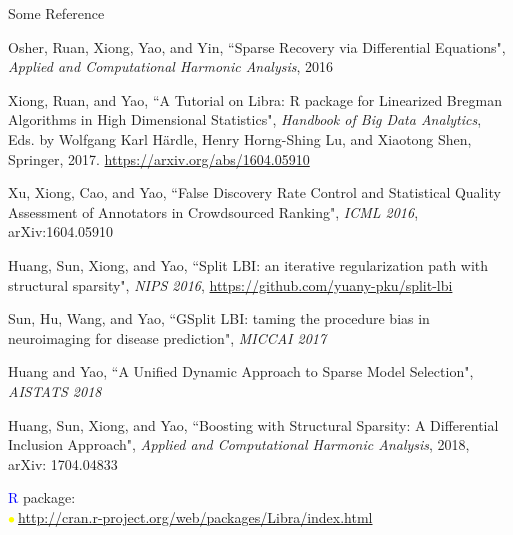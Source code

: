 \documentclass[slidestop,compress,9pt,epsfig,color]{beamer}
\theoremstyle{example}
\providecommand{\subitem}{\\ \textcolor{yellow}{$\bullet\ $}}
\begin{document}
\begin{frame}{Some Reference}
\begin{itemize}{\tiny
\item Osher, Ruan, Xiong, Yao, and Yin, ``Sparse Recovery via Differential Equations", \emph{Applied and Computational Harmonic Analysis}, 2016
\item Xiong, Ruan, and Yao, ``A Tutorial on Libra: R package for Linearized Bregman Algorithms in High Dimensional Statistics", \emph{Handbook of Big Data Analytics}, Eds. by Wolfgang Karl H\"{a}rdle, Henry Horng-Shing Lu, and Xiaotong Shen, Springer, 2017. \url{https://arxiv.org/abs/1604.05910}
\item Xu, Xiong, Cao, and Yao, ``False Discovery Rate Control and Statistical Quality Assessment of Annotators in Crowdsourced Ranking", \emph{ICML 2016}, arXiv:1604.05910
\item Huang, Sun, Xiong, and Yao, ``Split LBI: an iterative regularization path with structural sparsity", \emph{NIPS 2016}, \url{https://github.com/yuany-pku/split-lbi}
\item Sun, Hu, Wang, and Yao, ``GSplit LBI: taming the procedure bias in neuroimaging for disease prediction", \emph{MICCAI 2017}
\item Huang and Yao, ``A Unified Dynamic Approach to Sparse Model Selection", \emph{AISTATS 2018}
\item Huang, Sun, Xiong, and Yao, ``Boosting with Structural Sparsity: A Differential Inclusion Approach", \emph{Applied and Computational Harmonic Analysis}, 2018, arXiv: 1704.04833
\item \textcolor{blue}{R} package:
\subitem \url{http://cran.r-project.org/web/packages/Libra/index.html}}
\end{itemize}
\end{frame}
\end{document}
